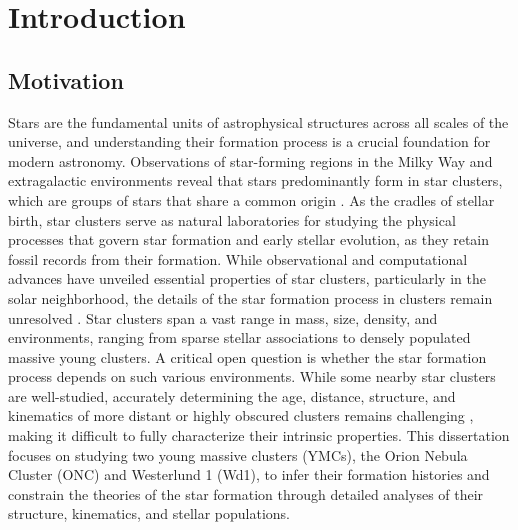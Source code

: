 \documentclass[12pt]{ucsddissertation}
\begin{document}
\begin{CJK*}{UTF8}{gbsn}
\begin{dissertationabstract}
\end{dissertationabstract}

\mainmatter

\newpage
{}%
%
\chapter*{Introduction}%
\label{chapter:intro}

%
%
\section*{Motivation}%
Stars are the fundamental units of astrophysical structures across all scales of the universe, and understanding their formation process is a crucial foundation for modern astronomy. Observations of star-forming regions in the Milky Way and extragalactic environments reveal that stars predominantly form in star clusters, which are groups of stars that share a common origin \citep[][]{Lada-2003, Gutermuth-2009}. As the cradles of stellar birth, star clusters serve as natural laboratories for studying the physical processes that govern star formation and early stellar evolution, as they retain fossil records from their formation. While observational and computational advances have unveiled essential properties of star clusters, particularly in the solar neighborhood, the details of the star formation process in clusters remain unresolved \citep[e.g.,][]{Longmore-2014, Krumholz-2019, Krause-2020}. Star clusters span a vast range in mass, size, density, and environments, ranging from sparse stellar associations to densely populated massive young clusters. A critical open question is whether the star formation process depends on such various environments. While some nearby star clusters are well-studied, accurately determining the age, distance, structure, and kinematics of more distant or highly obscured clusters remains challenging \citep[][]{Krumholz-2019}, making it difficult to fully characterize their intrinsic properties. This dissertation focuses on studying two young massive clusters (YMCs), the Orion Nebula Cluster (ONC) and Westerlund 1 (Wd1), to infer their formation histories and constrain the theories of the star formation through detailed analyses of their structure, kinematics, and stellar populations.



\end{CJK*}
\end{document}
